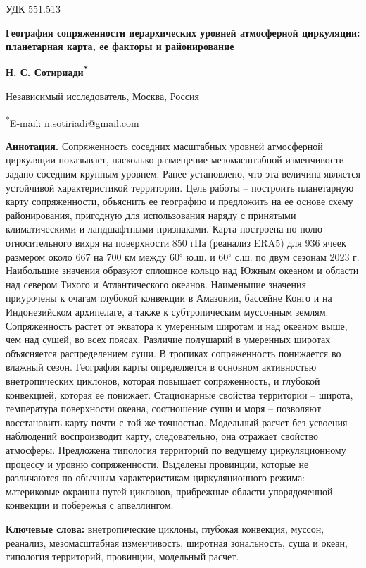 \documentclass[12pt,a4paper]{article}
\begin{document}
\noindent УДК 551.513

\begin{center}
{\large\bfseries География сопряженности иерархических уровней атмосферной циркуляции: планетарная карта, ее факторы и районирование}

\medskip
{\bfseries Н. С. Сотириади\textsuperscript{*}}

Независимый исследователь, Москва, Россия

\textsuperscript{*}E-mail: n.sotiriadi@gmail.com
\end{center}

\begin{singlespace}
\noindent\textbf{Аннотация.} Сопряженность соседних масштабных уровней атмосферной циркуляции показывает, насколько размещение мезомасштабной изменчивости задано соседним крупным уровнем. Ранее установлено, что эта величина является устойчивой характеристикой территории. Цель работы -- построить планетарную карту сопряженности, объяснить ее географию и предложить на ее основе схему районирования, пригодную для использования наряду с принятыми климатическими и ландшафтными признаками. Карта построена по полю относительного вихря на поверхности 850 гПа (реанализ ERA5) для 936 ячеек размером около 667 на 700 км между 60$^\circ$ ю.ш. и 60$^\circ$ с.ш. по двум сезонам 2023 г. Наибольшие значения образуют сплошное кольцо над Южным океаном и области над севером Тихого и Атлантического океанов. Наименьшие значения приурочены к очагам глубокой конвекции в Амазонии, бассейне Конго и на Индонезийском архипелаге, а также к субтропическим муссонным землям. Сопряженность растет от экватора к умеренным широтам и над океаном выше, чем над сушей, во всех поясах. Различие полушарий в умеренных широтах объясняется распределением суши. В тропиках сопряженность понижается во влажный сезон. География карты определяется в основном активностью внетропических циклонов, которая повышает сопряженность, и глубокой конвекцией, которая ее понижает. Стационарные свойства территории -- широта, температура поверхности океана, соотношение суши и моря -- позволяют восстановить карту почти с той же точностью. Модельный расчет без усвоения наблюдений воспроизводит карту, следовательно, она отражает свойство атмосферы. Предложена типология территорий по ведущему циркуляционному процессу и уровню сопряженности. Выделены провинции, которые не различаются по обычным характеристикам циркуляционного режима: материковые окраины путей циклонов, прибрежные области упорядоченной конвекции и побережья с апвеллингом.

\smallskip
\noindent\textbf{Ключевые слова:} внетропические циклоны, глубокая конвекция, муссон, реанализ, мезомасштабная изменчивость, широтная зональность, суша и океан, типология территорий, провинции, модельный расчет.
\end{singlespace}
\end{document}
